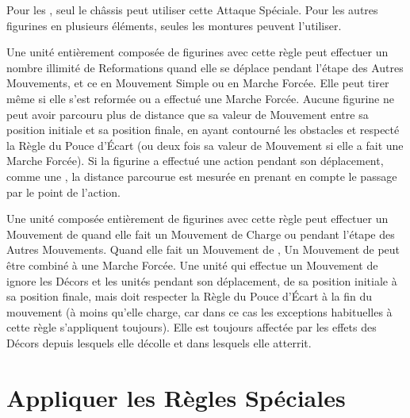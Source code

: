 Pour les \chariots{}, seul le châssis peut utiliser cette Attaque Spéciale. Pour les autres figurines en plusieurs éléments, seules les montures peuvent l'utiliser.

\newpage
{}

Une unité entièrement composée de figurines avec cette règle peut effectuer un nombre illimité de Reformations quand elle se déplace pendant l'étape des Autres Mouvements, et ce en Mouvement Simple ou en Marche Forcée. Elle peut tirer même si elle s'est reformée ou a effectué une Marche Forcée. Aucune figurine ne peut avoir parcouru plus de distance que sa valeur de Mouvement entre sa position initiale et sa position finale, en ayant contourné les obstacles et respecté la Règle du Pouce d'Écart (ou deux fois sa valeur de Mouvement si elle a fait une Marche Forcée). Si la figurine a effectué une action pendant son déplacement, comme une \sweepingattack{}, la distance parcourue est mesurée en prenant en compte le passage par le point de l'action. 


 Une unité composée entièrement de figurines avec cette règle peut effectuer un Mouvement de \fly{} quand elle fait un Mouvement de Charge ou pendant l'étape des Autres Mouvements. Quand elle fait un Mouvement de \fly{},  Un Mouvement de \fly{} peut être combiné à une Marche Forcée. Une unité qui effectue un Mouvement de \fly{} ignore les Décors et les unités pendant son déplacement, de sa position initiale à sa position finale, mais doit respecter la Règle du Pouce d'Écart à la fin du mouvement (à moins qu'elle charge, car dans ce cas les exceptions habituelles à cette règle s'appliquent toujours). Elle est toujours affectée par les effets des Décors depuis lesquels elle décolle et dans lesquels elle atterrit.

\newpage
\section{Appliquer les Règles Spéciales}

